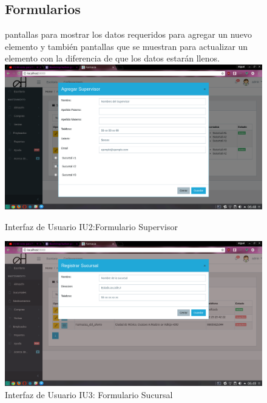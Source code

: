 \begin{figure}[htbp!]
	\begin{center}
	\subsection{Formularios}
	pantallas para mostrar los datos requeridos para agregar un nuevo elemento
y también pantallas que se muestran para actualizar un elemento 
con la diferencia de que los datos estarán llenos.
		\includegraphics[width=\textwidth]{Pantallas/FormularioSupervisor}
		\caption{Interfaz de Usuario IU2:Formulario Supervisor}
	\end{center}
\end{figure}




\begin{figure}[htbp!]
	\begin{center}
\includegraphics[width=\textwidth]{Pantallas/FormularioSucursal}
		\caption{Interfaz de Usuario IU3: Formulario Sucursal}
	\end{center}
\end{figure}



